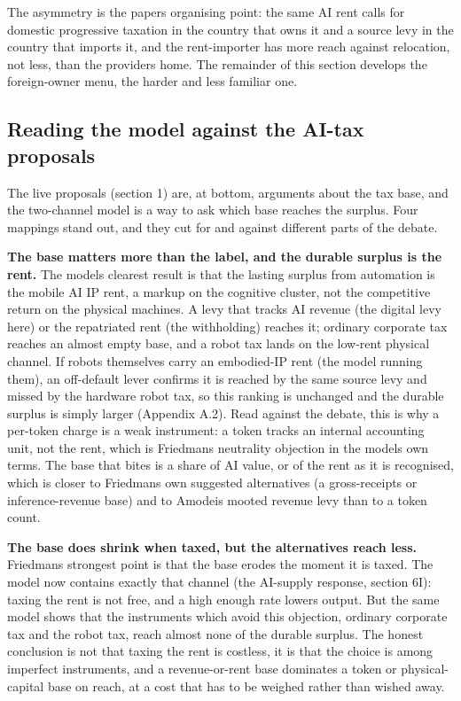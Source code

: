 \documentclass[12pt]{article}
\begin{document}
The asymmetry is the paper\textquotesingle s organising point: the same
AI rent calls for domestic progressive taxation in the country that owns
it and a source levy in the country that imports it, and the
rent-importer has more reach against relocation, not less, than the
provider\textquotesingle s home. The remainder of this section develops
the foreign-owner menu, the harder and less familiar one.

\hypertarget{reading-the-model-against-the-ai-tax-proposals}{%
\subsection{Reading the model against the AI-tax
proposals}\label{reading-the-model-against-the-ai-tax-proposals}}

The live proposals (section 1) are, at bottom, arguments about the tax
base, and the two-channel model is a way to ask which base reaches the
surplus. Four mappings stand out, and they cut for and against different
parts of the debate.

\textbf{The base matters more than the label, and the durable surplus is
the rent.} The model\textquotesingle s clearest result is that the
lasting surplus from automation is the mobile AI IP rent, a markup on
the cognitive cluster, not the competitive return on the physical
machines. A levy that tracks AI revenue (the digital levy here) or the
repatriated rent (the withholding) reaches it; ordinary corporate tax
reaches an almost empty base, and a robot tax lands on the low-rent
physical channel. If robots themselves carry an embodied-IP rent (the
model running them), an off-default lever confirms it is reached by the
same source levy and missed by the hardware robot tax, so this ranking
is unchanged and the durable surplus is simply larger (Appendix A.2).
Read against the debate, this is why a per-token charge is a weak
instrument: a token tracks an internal accounting unit, not the rent,
which is Friedman\textquotesingle s neutrality objection in the
model\textquotesingle s own terms. The base that bites is a share of AI
value, or of the rent as it is recognised, which is closer to
Friedman\textquotesingle s own suggested alternatives (a gross-receipts
or inference-revenue base) and to Amodei\textquotesingle s mooted
revenue levy than to a token count.

\textbf{The base does shrink when taxed, but the alternatives reach
less.} Friedman\textquotesingle s strongest point is that the base
erodes the moment it is taxed. The model now contains exactly that
channel (the AI-supply response, section 6I): taxing the rent is not
free, and a high enough rate lowers output. But the same model shows
that the instruments which avoid this objection, ordinary corporate tax
and the robot tax, reach almost none of the durable surplus. The honest
conclusion is not that taxing the rent is costless, it is that the
choice is among imperfect instruments, and a revenue-or-rent base
dominates a token or physical-capital base on reach, at a cost that has
to be weighed rather than wished away.
\end{document}
